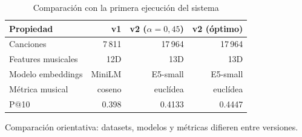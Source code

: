 \begin{table}[htbp]
  \centering
  \caption{Comparación con la primera ejecución del sistema}
  \label{tab:recommendation_v1_comparison}
  \begin{tabular}{lrrr}
    \toprule
    Propiedad & v1 & v2 ($\alpha = 0{,}45$) & v2 (óptimo) \\
    \midrule
    Canciones & 7\,811 & 17\,964 & 17\,964 \\
    Features musicales & 12D & 13D & 13D \\
    Modelo embeddings & MiniLM & E5-small & E5-small \\
    Métrica musical & coseno & euclídea & euclídea \\
    P@10 & 0.398 & 0.4133 & 0.4447 \\
    \bottomrule
  \end{tabular}
  \begin{tablenotes}[flushleft]
    \small
    \item Comparación orientativa: datasets, modelos y métricas difieren entre versiones.
  \end{tablenotes}
\end{table}